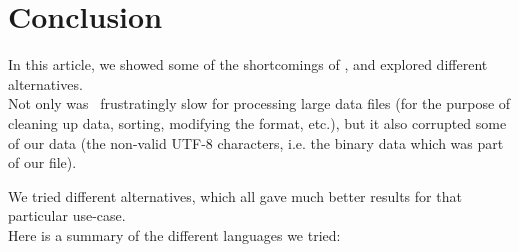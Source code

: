 \newpage


\section*{Conclusion}


In this article, we showed some of the shortcomings of \python, and explored different alternatives. \\

Not only was \python\ frustratingly slow for processing large data files (for the purpose of cleaning up data, sorting, modifying the format, etc.), but it also corrupted some of our data (the non-valid UTF-8 characters, i.e. the binary data which was part of our file). 

We tried different alternatives, which all gave much better results for that particular use-case. \\


Here is a summary of the different languages we tried:
 
